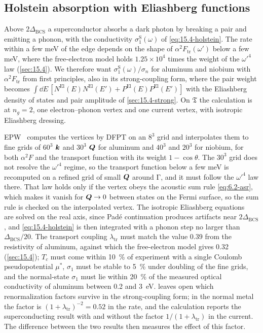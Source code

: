 \subsection{Holstein absorption with Eliashberg functions}

Above $2\Delta_{\mathrm{BCS}}$ a superconductor absorbs a dark photon by breaking a pair and emitting a phonon, with the conductivity $\sigma_1^{\mathrm{S}}(\omega)$ of \cref{eq:15.4-holstein}. The rate within a few meV of the edge depends on the shape of $\alpha^2F_{\mathrm{tr}}(\omega')$ below a few meV, where the free-electron model holds $1.25\times10^4$ times the weight of the $\omega'^4$ law (\cref{sec:15.4}). We therefore want $\sigma_1^{\mathrm{S}}(\omega)/\sigma_n$ for aluminum and niobium with $\alpha^2F_{\mathrm{tr}}$ from first principles, also in its strong-coupling form, where the pair weight becomes $\int\dd E\,[N^{\mathrm{El}}(E)N^{\mathrm{El}}(E') + P^{\mathrm{El}}(E)P^{\mathrm{El}}(E')]$ with the Eliashberg density of states and pair amplitude of \cref{sec:15.4-strong}. On $\mathfrak{T}$ the calculation is at $n_g = 2$, one electron--phonon vertex and one current vertex, with isotropic Eliashberg dressing.

EPW~\cite{ponce2016epw} computes the vertices by DFPT on an $8^3$ grid and interpolates them to fine grids of $60^3$ $\bm{k}$ and $30^3$ $\bm{Q}$ for aluminum and $40^3$ and $20^3$ for niobium, for both $\alpha^2F$ and the transport function with its weight $1 - \cos\theta$. The $30^3$ grid does not resolve the $\omega'^4$ regime, so the transport function below a few meV is recomputed on a refined grid of small $\bm{Q}$ around $\mathrm{\Gamma}$, and it must follow the $\omega'^4$ law there. That law holds only if the vertex obeys the acoustic sum rule \cref{eq:6.2-asr}, which makes it vanish for $\bm{Q}\to0$ between states on the Fermi surface, so the sum rule is checked on the interpolated vertex. The isotropic Eliashberg equations~\cite{margine2013anisotropic} are solved on the real axis, since Pad\'e continuation produces artifacts near $2\Delta_{\mathrm{BCS}}$, and \cref{eq:15.4-holstein} is then integrated with a phonon step no larger than $\Delta_{\mathrm{BCS}}/20$. The transport coupling $\lambda_{\mathrm{tr}}$ must match the value 0.39 from the resistivity of aluminum, against which the free-electron model gives 0.32 (\cref{sec:15.4}); $T_c$ must come within \SI{10}{\percent} of experiment with a single Coulomb pseudopotential $\mu^*$, $\sigma_1$ must be stable to \SI{5}{\percent} under doubling of the fine grids, and the normal-state $\sigma_1$ must lie within \SI{20}{\percent} of the measured optical conductivity of aluminum between 0.2 and \SI{3}{eV}.  leaves open which renormalization factors survive in the strong-coupling form; in the normal metal the factor is $(1 + \lambda_{\mathrm{tr}})^{-2} = 0.52$ in the rate, and the calculation reports the superconducting result with and without the factor $1/(1 + \lambda_{\mathrm{tr}})$ in the current. The difference between the two results then measures the effect of this factor.

